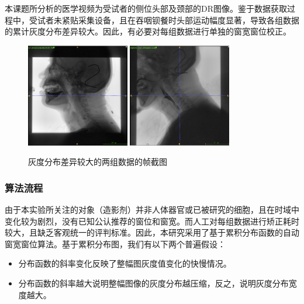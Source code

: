 本课题所分析的医学视频为受试者的侧位头部及颈部的DR图像。鉴于数据获取过程中，受试者未紧贴采集设备，且在吞咽钡餐时头部运动幅度显著，导致各组数据的累计灰度分布差异较大。因此，有必要对每组数据进行单独的窗宽窗位校正。
\begin{figure}[!htp]
    \centering
    \includegraphics[width=0.4\textwidth]{figures/2_1_1.png}
    \includegraphics[width=0.4\textwidth]{figures/2_1_2.png}
    \caption{灰度分布差异较大的两组数据的帧截图}
    \label{fig:2_1_原始图像}
\end{figure}

\subsubsection{算法流程}

由于本实验所关注的对象（造影剂）并非人体器官或已被研究的细胞，且在时域中变化较为剧烈，没有已知公认推荐的窗位和窗宽。而人工对每组数据进行矫正耗时较大，且缺乏客观统一的评判标准。因此，本研究采用了基于累积分布函数的自动窗宽窗位算法。基于累积分布图，我们有以下两个普遍假设：
\begin{itemize}
    \item 分布函数的斜率变化反映了整幅图灰度值变化的快慢情况。
    \item 分布函数的斜率越大说明整幅图像的灰度分布越压缩，反之，说明灰度分布宽度越大。
\end{itemize}

